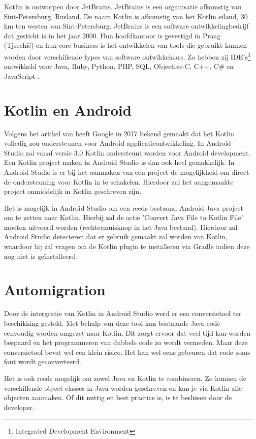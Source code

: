 Kotlin is ontworpen door JetBrains. JetBrains is een organisatie afkomstig van Sint-Petersburg, Rusland. De naam Kotlin is afkomstig van het Kotlin eiland, 30 km ten westen van Sint-Petersburg. JetBrains is een software ontwikkelingbedrijf dat gesticht is in het jaar 2000. Hun hoofdkantoor is gevestigd in Praag (Tjsechië) en hun core-business is het ontwikkelen van tools die gebruikt kunnen worden door verschillende types van software ontwikkelaars. Zo hebben zij IDE's\footnote{Integrated Development Environment} ontwikkeld voor Java, Ruby, Python, PHP, SQL, Objective-C, C++, C\# en JavaScript \autocite{JetBrainsOverView}.

\section{Kotlin en Android}
\label{sec:kotlinandroid}
Volgens het artikel van \textcite{GoogleSupportKotlin} heeft Google in 2017 bekend gemaakt dat het Kotlin volledig zou ondersteunen voor Android applicatieontwikkeling. In Android Studio zal vanaf versie 3.0 Kotlin ondersteunt worden voor Android development. Een Kotlin project maken in Android Studio is dan ook heel gemakkelijk. In Android Studio is er bij het aanmaken van een project de mogelijkheid om direct de ondersteuning voor Kotlin in te schakelen. Hierdoor zal het aangemaakte project onmiddelijk in Kotlin geschreven zijn.

Het is mogelijk in Android Studio om een reeds bestaand Android Java project om te zetten naar Kotlin. Hierbij zal de actie 'Convert Java File to Kotlin File' moeten uitvoerd worden (rechtermuisknop in het Java bestand). Hierdoor zal Android Studio detecteren dat er gebruik gemaakt zal worden van Kotlin, waardoor hij zal vragen om de Kotlin plugin te installeren via Gradle indien deze nog niet is geïnstalleerd.


\section{Automigration}
\label{sec:Automigration}
Door de intergratie van Kotlin in Android Studio werd er een conversietool ter beschikking gesteld. Met behulp van deze tool kan bestaande Java-code eenvoudig worden omgezet naar Kotlin. Dit zorgt ervoor dat veel tijd kan worden bespaard en het programmeren van dubbele code zo wordt vermeden. Maar deze conversietool bevat wel een klein risico. Het kan wel eens gebeuren dat code soms fout wordt geconverteerd. 

Het is ook reeds mogelijk om zowel Java en Kotlin te combineren. Zo kunnen de verschillende object classes in Java worden geschreven en kan je via Kotlin alle objecten aanmaken. Of dit nuttig en best practice is, is te beslissen door de developer.

